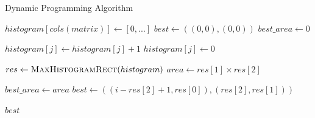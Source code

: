 \documentclass{article}
\begin{document}
\FloatBarrier
\begin{algorithm}
\caption{Dynamic Programming Algorithm}
\begin{algorithmic}[1]
	\State $histogram[cols(matrix)] \gets [0, ... ]$
	\State $best \gets ((0,0),(0,0))$
	\State $best\_area \gets 0$

				\State $histogram[j] \gets histogram[j] + 1$
			\Else
				\State $histogram[j] \gets 0$
			\EndIf

			\State $res \gets \Call{MaxHistogramRect}{histogram}$
			\State $area \gets res[1] \times res[2]$
			
				\State $best\_area \gets area$
				\State $best \gets ((i-res[2]+1,res[0]),(res[2],res[1]))$
			\EndIf
		\EndFor
	\EndFor

	\State \Return $best$
\EndFunction
\end{algorithmic}
\end{algorithm}
\FloatBarrier
\end{document}
